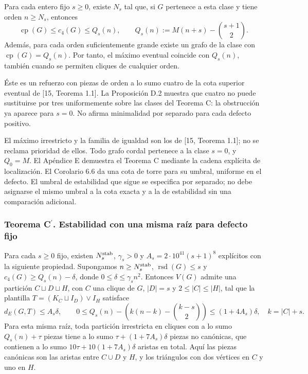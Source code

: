 \documentclass[spanish,11pt,a4paper]{article}
\begin{document}
Para cada entero fijo \(s\ge0\), existe \(N_s\) tal que, si \(G\) pertenece a esta clase y tiene orden \(n\ge N_s\), entonces \[
\operatorname{cp}(G)\le c_4(G)\le Q_s(n),
\qquad
Q_s(n):=M(n+s)-\binom{s+1}{2}.
\tag{C}
\] Además, para cada orden suficientemente grande existe un grafo de la clase con \(\operatorname{cp}(G)=Q_s(n)\). Por tanto, el máximo eventual coincide con \(Q_s(n)\), también cuando se permiten cliques de cualquier orden.

Éste es un refuerzo con piezas de orden a lo sumo cuatro de la cota superior eventual de {[}15, Teorema 1.1{]}. La Proposición D.2 muestra que cuatro no puede sustituirse por tres uniformemente sobre las clases del Teorema C: la obstrucción ya aparece para \(s=0\). No afirma minimalidad por separado para cada defecto positivo.

El máximo irrestricto y la familia de igualdad son los de {[}15, Teorema 1.1{]}; no se reclama prioridad de ellos. Todo grafo cordal pertenece a la clase \(s=0\), y \(Q_0=M\). El Apéndice E demuestra el Teorema C mediante la cadena explícita de localización. El Corolario 6.6 da una cota de torre para su umbral, uniforme en el defecto. El umbral de estabilidad que sigue se especifica por separado; no debe asignarse el mismo umbral a la cota exacta y a la de estabilidad sin una comparación adicional.

\subsubsection{Teorema \texorpdfstring{C\ensuremath{^{\prime}}}{C'}. Estabilidad con una misma raíz para defecto fijo}\label{teorema-c.-estabilidad-con-una-misma-raiz-para-defecto-fijo}

Para cada \(s\ge0\) fijo, existen \(N_s^{\rm stab}\), \(\gamma_s>0\) y \(A_s=2\cdot10^{41}(s+1)^8\) explícitos con la siguiente propiedad. Supongamos \(n\ge N_s^{\rm stab}\), \(\operatorname{rsd}(G)\le s\) y \(c_4(G)\ge Q_s(n)-\delta\), donde \(0\le\delta\le\gamma_s n^2\). Entonces \(V(G)\) admite una partición \(C\sqcup D\sqcup H\), con \(C\) una clique de \(G\), \(|D|=s\) y \(2\le |C|\le |H|\), tal que la plantilla \(T=(K_C\sqcup I_D)\vee I_H\) satisface \[
d_E(G,T)\le A_s\delta,\qquad
0\le Q_s(n)-\left(k(n-k)-\binom{k-s}{2}\right)\le(1+4A_s)\delta,
\quad k=|C|+s.
\] Para esta misma raíz, toda partición irrestricta en cliques con a lo sumo \(Q_s(n)+\tau\) piezas tiene a lo sumo \(\tau+(1+7A_s)\delta\) piezas no canónicas, que contienen a lo sumo \(10\tau+10(1+7A_s)\delta\) aristas en total. Aquí las piezas canónicas son las aristas entre \(C\cup D\) y \(H\), y los triángulos con dos vértices en \(C\) y uno en \(H\).
\end{document}

